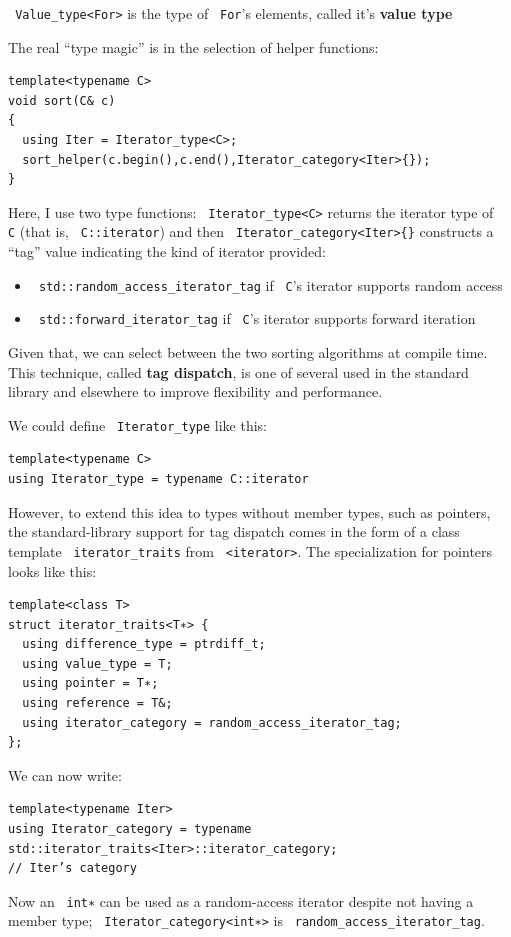 \documentclass[11pt]{article}
\let\OldTexttt\texttt
\renewcommand{\texttt}[1]{\OldTexttt{\color{MidnightBlue} #1}}
\begin{document}
\texttt{Value\_type<For>} is the type of \texttt{For}'s elements, called it's \textbf{value type}

The real ``type magic'' is in the selection of helper functions:
\begin{verbatim}
template<typename C>
void sort(C& c)
{
  using Iter = Iterator_type<C>;
  sort_helper(c.begin(),c.end(),Iterator_category<Iter>{});
}
\end{verbatim}
Here, I use two type functions: \texttt{Iterator\_type<C>} returns the iterator type of \texttt{C} (that is,
\texttt{C::iterator}) and then \texttt{Iterator\_category<Iter>\{\}} constructs a ``tag'' value indicating the kind of
iterator provided:
\begin{itemize}
\item \texttt{std::random\_access\_iterator\_tag} if \texttt{C}'s iterator supports random access
\item \texttt{std::forward\_iterator\_tag} if \texttt{C}'s iterator supports forward iteration
\end{itemize}

Given that, we can select between the two sorting algorithms at compile time. This technique,
called \textbf{tag dispatch}, is one of several used in the standard library and elsewhere to improve
flexibility and performance.

We could define \texttt{Iterator\_type} like this:
\begin{verbatim}
template<typename C>
using Iterator_type = typename C::iterator
\end{verbatim}

However, to extend this idea to types without member types, such as pointers, the
standard-library support for tag dispatch comes in the form of a class template \texttt{iterator\_traits}
from \texttt{<iterator>}. The specialization for pointers looks like this:
\begin{verbatim}
template<class T>
struct iterator_traits<T∗> {
  using difference_type = ptrdiff_t;
  using value_type = T;
  using pointer = T∗;
  using reference = T&;
  using iterator_category = random_access_iterator_tag;
};
\end{verbatim}

We can now write:
\begin{verbatim}
template<typename Iter>
using Iterator_category = typename std::iterator_traits<Iter>::iterator_category;
// Iter’s category
\end{verbatim}

Now an \texttt{int∗} can be used as a random-access iterator despite not having a member type;
\texttt{Iterator\_category<int∗>} is \texttt{random\_access\_iterator\_tag}.
\end{document}
